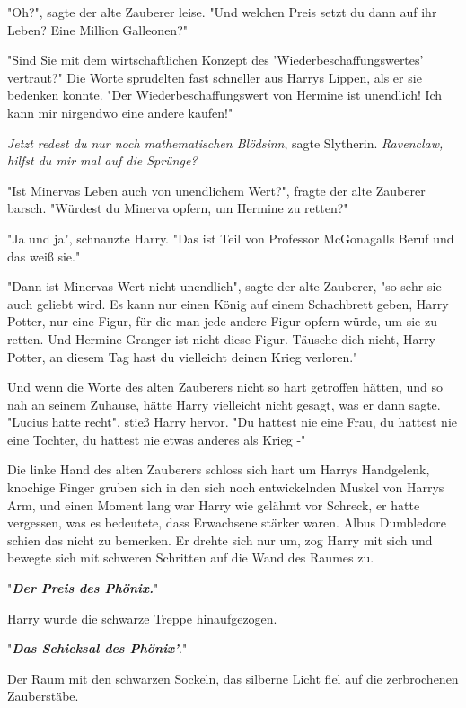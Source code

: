{"Oh?", sagte der alte Zauberer leise. "Und welchen Preis setzt du dann auf ihr Leben? Eine Million Galleonen?"

"Sind Sie mit dem wirtschaftlichen Konzept des 'Wiederbeschaffungswertes' vertraut?" Die Worte sprudelten fast schneller aus Harrys Lippen, als er sie bedenken konnte. "Der Wiederbeschaffungswert von Hermine ist unendlich! Ich kann mir nirgendwo eine andere kaufen!"

\emph{Jetzt redest du nur noch mathematischen Blödsinn}, sagte Slytherin. \emph{Ravenclaw, hilfst du mir mal auf die Sprünge?}

"Ist Minervas Leben auch von unendlichem Wert?", fragte der alte Zauberer barsch. "Würdest du Minerva opfern, um Hermine zu retten?"

"Ja und ja", schnauzte Harry. "Das ist Teil von Professor McGonagalls Beruf und das weiß sie."

"Dann ist Minervas Wert nicht unendlich", sagte der alte Zauberer, "so sehr sie auch geliebt wird. Es kann nur einen König auf einem Schachbrett geben, Harry Potter, nur eine Figur, für die man jede andere Figur opfern würde, um sie zu retten. Und Hermine Granger ist nicht diese Figur. Täusche dich nicht, Harry Potter, an diesem Tag hast du vielleicht deinen Krieg verloren."

Und wenn die Worte des alten Zauberers nicht so hart getroffen hätten, und so nah an seinem Zuhause, hätte Harry vielleicht nicht gesagt, was er dann sagte.\\ "Lucius hatte recht", stieß Harry hervor. "Du hattest nie eine Frau, du hattest nie eine Tochter, du hattest nie etwas anderes als Krieg -"

Die linke Hand des alten Zauberers schloss sich hart um Harrys Handgelenk, knochige Finger gruben sich in den sich noch entwickelnden Muskel von Harrys Arm, und einen Moment lang war Harry wie gelähmt vor Schreck, er hatte vergessen, was es bedeutete, dass Erwachsene stärker waren. Albus Dumbledore schien das nicht zu bemerken. Er drehte sich nur um, zog Harry mit sich und bewegte sich mit schweren Schritten auf die Wand des Raumes zu.

"\textbf{\emph{Der Preis des Phönix.}}"

Harry wurde die schwarze Treppe hinaufgezogen.

"\textbf{\emph{Das Schicksal des Phönix'}}."

Der Raum mit den schwarzen Sockeln, das silberne Licht fiel auf die zerbrochenen Zauberstäbe.

}
